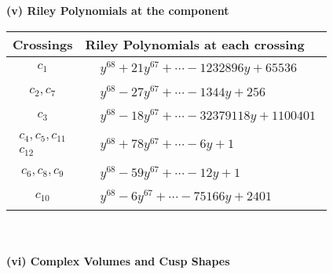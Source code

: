 \documentclass[1p]{elsarticle_modified}
\theoremstyle{definition}
\begin{document}
\newpage\renewcommand{\arraystretch}{1}
\flushleft \textbf{(v) Riley Polynomials at the component}\newline \\
\begin{tabular}{m{50pt}|m{274pt}}
Crossings & \hspace{64pt}Riley Polynomials at each crossing \\
\hline $$\begin{aligned}c_{1}\end{aligned}$$&$\begin{aligned}
&y^{68}+21 y^{67}+\cdots-1232896 y+65536
\end{aligned}$\\
\hline $$\begin{aligned}c_{2},c_{7}\end{aligned}$$&$\begin{aligned}
&y^{68}-27 y^{67}+\cdots-1344 y+256
\end{aligned}$\\
\hline $$\begin{aligned}c_{3}\end{aligned}$$&$\begin{aligned}
&y^{68}-18 y^{67}+\cdots-32379118 y+1100401
\end{aligned}$\\
\hline $$\begin{aligned}c_{4},c_{5},c_{11}\\c_{12}\end{aligned}$$&$\begin{aligned}
&y^{68}+78 y^{67}+\cdots-6 y+1
\end{aligned}$\\
\hline $$\begin{aligned}c_{6},c_{8},c_{9}\end{aligned}$$&$\begin{aligned}
&y^{68}-59 y^{67}+\cdots-12 y+1
\end{aligned}$\\
\hline $$\begin{aligned}c_{10}\end{aligned}$$&$\begin{aligned}
&y^{68}-6 y^{67}+\cdots-75166 y+2401
\end{aligned}$\\
\hline
\end{tabular}\\~\\
\newpage\flushleft \textbf{(vi) Complex Volumes and Cusp Shapes}
\end{document}

